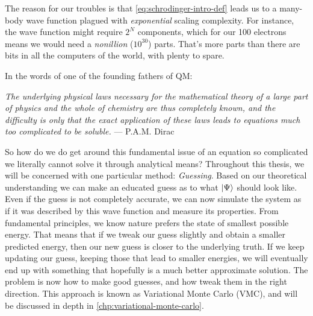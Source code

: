 \documentclass[Thesis.tex]{subfiles}
\begin{document}
The reason for our troubles is that \cref{eq:schrodinger-intro-def} leads us to
a many-body wave function plagued with \emph{exponential} scaling complexity.
For instance, the wave function might require $2^N$ components, which for our
100 electrons means we would need a \emph{nonillion} ($10^{30}$) parts. That's
more parts than there are bits in all the computers of the world, with plenty to
spare.

\begin{comment}
In most other areas of science we have been able to tame the mathematical
challenges through sophisticated high-performance computational frameworks.
Scaling complexities of $N^2$, $N^3$ or similar can usually be overcome by
simply using bigger and better computers, all the way to supercomputers with
hundreds of thousands of cores. But exponential scaling - that becomes
infeasible quickly.
\end{comment}

In the words of one of the founding fathers of QM:
\begin{displayquote}
\emph{The underlying physical laws necessary for the mathematical theory of a large
part of physics and the whole of chemistry are thus completely known, and the
difficulty is only that the exact application of these laws leads to equations
much too complicated to be soluble.} --- P.A.M. Dirac
\end{displayquote}


So how do we do get around this fundamental issue of an equation so complicated
we literally cannot solve it through analytical means? Throughout this thesis,
we will be concerned with one particular method: \emph{Guessing}. Based on our
theoretical understanding we can make an educated guess as to what $| \Psi \rangle$
should look like. Even if the guess is not completely accurate, we can now
simulate the system as if it was described by this wave function and measure its
properties. From fundamental principles, we know nature prefers the state of
smallest possible energy. That means that if we tweak our guess slightly and
obtain a smaller predicted energy, then our new guess is closer to the
underlying truth. If we keep updating our guess, keeping those that lead to
smaller energies, we will eventually end up with something that hopefully is a
much better approximate solution. The problem is now how to make good guesses,
and how tweak them in the right direction. This approach is known as Variational
Monte Carlo (VMC), and will be discussed in depth in
\cref{chp:variational-monte-carlo}.\\
\end{document}
